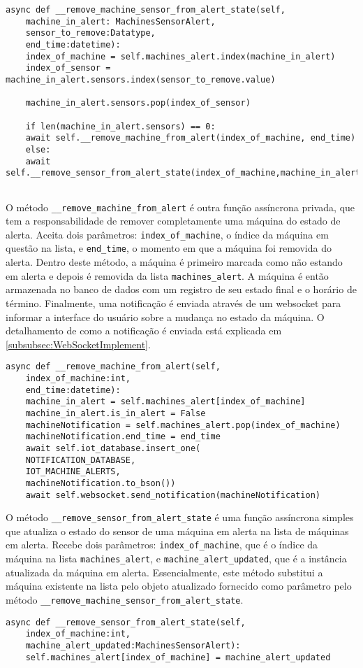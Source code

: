 \begin{verbatim}
async def __remove_machine_sensor_from_alert_state(self,
    machine_in_alert: MachinesSensorAlert,
    sensor_to_remove:Datatype,
    end_time:datetime):
    index_of_machine = self.machines_alert.index(machine_in_alert)
    index_of_sensor = machine_in_alert.sensors.index(sensor_to_remove.value)
    
    machine_in_alert.sensors.pop(index_of_sensor)
    
    if len(machine_in_alert.sensors) == 0:
    await self.__remove_machine_from_alert(index_of_machine, end_time)
    else:
    await self.__remove_sensor_from_alert_state(index_of_machine,machine_in_alert)
    
\end{verbatim}

O método \texttt{\_\_remove\_machine\_from\_alert} é outra função assíncrona privada, que tem a responsabilidade de remover completamente uma máquina do estado de alerta. Aceita dois parâmetros: \texttt{index\_of\_machine}, o índice da máquina em questão na lista, e \texttt{end\_time}, o momento em que a máquina foi removida do alerta. Dentro deste método, a máquina é primeiro marcada como não estando em alerta e depois é removida da lista \texttt{machines\_alert}. A máquina é então armazenada no banco de dados com um registro de seu estado final e o horário de término. Finalmente, uma notificação é enviada através de um websocket para informar a interface do usuário sobre a mudança no estado da máquina. O detalhamento de como a notificação é enviada está explicada em \ref{subsubsec:WebSocketImplement}.

\begin{verbatim}
async def __remove_machine_from_alert(self,
    index_of_machine:int,
    end_time:datetime):
    machine_in_alert = self.machines_alert[index_of_machine]
    machine_in_alert.is_in_alert = False
    machineNotification = self.machines_alert.pop(index_of_machine)
    machineNotification.end_time = end_time
    await self.iot_database.insert_one(
    NOTIFICATION_DATABASE,
    IOT_MACHINE_ALERTS,
    machineNotification.to_bson())
    await self.websocket.send_notification(machineNotification)    
\end{verbatim}

O método \texttt{\_\_remove\_sensor\_from\_alert\_state} é uma função assíncrona simples que atualiza o estado do sensor de uma máquina em alerta na lista de máquinas em alerta. Recebe dois parâmetros: \texttt{index\_of\_machine}, que é o índice da máquina na lista \texttt{machines\_alert}, e \texttt{machine\_alert\_updated}, que é a instância atualizada da máquina em alerta. Essencialmente, este método substitui a máquina existente na lista pelo objeto atualizado fornecido como parâmetro pelo método \texttt{\_\_remove\_machine\_sensor\_from\_alert\_state}.

\begin{verbatim}
async def __remove_sensor_from_alert_state(self,
    index_of_machine:int,
    machine_alert_updated:MachinesSensorAlert):
    self.machines_alert[index_of_machine] = machine_alert_updated
\end{verbatim}
